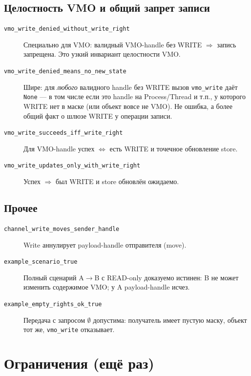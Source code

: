 \documentclass[11pt,a4paper]{article}
\begin{document}
\subsection{Целостность VMO и общий запрет записи}

\begin{description}
  \item[\texttt{vmo\_write\_denied\_without\_write\_right}]
        Специально для VMO: валидный VMO-handle без WRITE $\Rightarrow$
        запись запрещена. Это узкий инвариант целостности VMO.
  \item[\texttt{vmo\_write\_denied\_means\_no\_new\_state}]
        Шире: для \emph{любого} валидного handle без WRITE вызов
        \texttt{vmo\_write} даёт \texttt{None} --- в том числе если это
        handle на Process/Thread и т.п., у которого WRITE нет в маске
        (или объект вовсе не VMO). Не ошибка, а более общий факт о шлюзе
        WRITE у операции записи.
  \item[\texttt{vmo\_write\_succeeds\_iff\_write\_right}]
        Для VMO-handle успех $\Leftrightarrow$ есть WRITE и точечное
        обновление store.
  \item[\texttt{vmo\_write\_updates\_only\_with\_write\_right}]
        Успех $\Rightarrow$ был WRITE и store обновлён ожидаемо.
\end{description}

\subsection{Прочее}

\begin{description}
  \item[\texttt{channel\_write\_moves\_sender\_handle}]
        Write аннулирует payload-handle отправителя (move).
  \item[\texttt{example\_scenario\_true}]
        Полный сценарий A$\to$B с READ-only доказуемо истинен: B не может
        изменить содержимое VMO; у A payload-handle исчез.
  \item[\texttt{example\_empty\_rights\_ok\_true}]
        Передача с запросом $\emptyset$ допустима: получатель имеет пустую
        маску, объект тот же, \texttt{vmo\_write} отказывает.
\end{description}

\section{Ограничения (ещё раз)}
\end{document}
